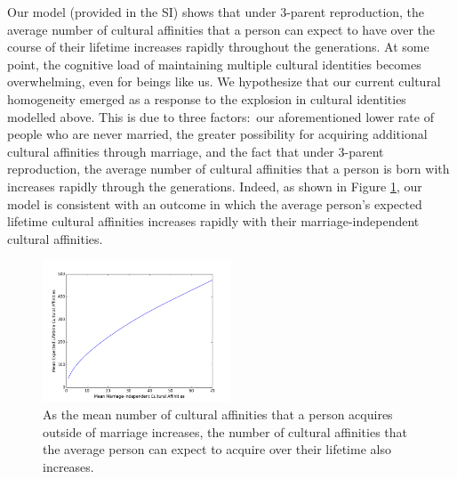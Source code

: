 \documentclass{report}
\begin{document}
Our model (provided in the SI) shows that under 3-parent reproduction, the average number of cultural affinities that a person can expect to have over the course of their lifetime increases rapidly throughout the generations. At some point, the cognitive load of maintaining multiple cultural identities becomes overwhelming, even for beings like us. We hypothesize that our current cultural homogeneity emerged as a response to the explosion in cultural identities modelled above. This is due to three factors:\ our aforementioned lower rate of people who are never married, the greater possibility for acquiring additional cultural affinities through marriage, and the fact that under 3-parent reproduction, the average number of cultural affinities that a person is born with increases rapidly through the generations. Indeed, as shown in Figure \ref{fig:cultureplot}, our model is consistent with an outcome in which the average person's expected lifetime cultural affinities increases rapidly with their marriage-independent cultural affinities.\par 

\begin{figure}[htb!]
    \centering
    \includegraphics[width = 0.5\textwidth]{culture1.png}
    \caption{As the mean number of cultural affinities that a person acquires outside of marriage increases, the number of cultural affinities that the average person can expect to acquire over their lifetime also increases.}
    \label{fig:cultureplot}
\end{figure}
\end{document}
